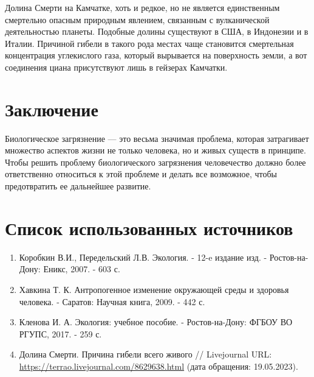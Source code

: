 \documentclass[a4paper, 12pt]{extarticle}
\begin{document}
Долина Смерти на Камчатке, хоть и редкое, но не является единственным смертельно опасным природным явлением, связанным с вулканической деятельностью планеты. Подобные долины существуют в США, в Индонезии и в Италии. Причиной гибели в такого рода местах чаще становится смертельная концентрация углекислого газа, который вырывается на поверхность земли, а вот соединения циана присутствуют лишь в гейзерах Камчатки.

\section{Заключение}

Биологическое загрязнение --- это весьма значимая проблема, которая затрагивает множество аспектов жизни не только человека, но и живых существ в принципе. Чтобы решить проблему биологического загрязнения человечество должно более ответственно относиться к этой проблеме и делать все возможное, чтобы предотвратить ее дальнейшее развитие.

\section{Список использованных источников}

\begin{enumerate}
    \item Коробкин В.И., Передельский Л.В. Экология. - 12-e издание изд. - Ростов-на-Дону: Еникс, 2007. - 603 с.
    \item Хавкина Т. К. Антропогенное изменение окружающей среды и здоровья человека. - Саратов: Научная книга, 2009. - 442 с.
    \item Кленова И. А. Экология: учебное пособие. - Ростов-на-Дону: ФГБОУ ВО РГУПС, 2017. - 259 с.
    \item Долина Смерти. Причина гибели всего живого // Livejournal URL: \url{https://terrao.livejournal.com/8629638.html} (дата обращения: 19.05.2023).
\end{enumerate}
\end{document}
